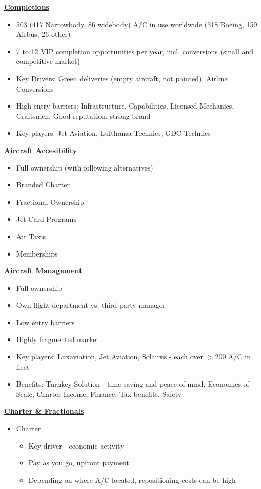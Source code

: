 \documentclass[9pt, landscape, fleqn]{scrartcl}
\begin{document}
\begin{multicols*}{3}
\underline{\textbf{Completions}}
\begin{itemize}
    \item 503 (417 Narrowbody, 86 widebody) A/C in use worldwide (318 Boeing, 159 Airbus, 26 other)
    \item 7 to 12 VIP completion opportunities per year, incl. conversions (small and competitive market)
    \item Key Drivers: Green deliveries (empty aircraft, not painted), Airline Conversions
    \item High entry barriers: Infrastructure, Capabilities, Licensed Mechanics, Craftsmen, Good reputation, strong brand 
    \item Key players: Jet Aviation, Lufthansa Technics, GDC Technics 
\end{itemize}
\underline{\textbf{Aircraft Accesibility}}
\begin{itemize}
    \item Full ownership (with following alternatives)
    \item Branded Charter 
    \item Fractional Ownership 
    \item Jet Card Programs 
    \item Air Taxis 
    \item Memberships 
\end{itemize}
\underline{\textbf{Aircraft Management}}
\begin{itemize}
    \item Full ownership
    \item Own flight department vs. third-party manager 
    \item Low entry barriers 
    \item Highly fragmented market 
    \item Key players: Luxaviation, Jet Aviation, Solairus - each over $>200$ A/C in fleet 
    \item Benefits: Turnkey Solution - time saving and peace of mind, Economies of Scale, Charter Income, Finance, Tax benefits, Safety 
\end{itemize}
\underline{\textbf{Charter \& Fractionals}}
\begin{itemize}
    \item Charter 
    \begin{itemize}
        \item Key driver - economic activity 
        \item Pay as you go, upfront payment 
        \item Depending on where A/C located, repositioning costs can be high 

\end{itemize}
\end{itemize}
\end{multicols*}
\end{document}
